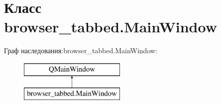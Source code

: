 \hypertarget{classbrowser__tabbed_1_1MainWindow}{}\section{Класс browser\+\_\+tabbed.\+Main\+Window}
\label{classbrowser__tabbed_1_1MainWindow}
Граф наследования\+:browser\+\_\+tabbed.\+Main\+Window\+:\begin{figure}[H]
\begin{center}
\leavevmode
\includegraphics[height=2.000000cm]{classbrowser__tabbed_1_1MainWindow}
\end{center}
\end{figure}
